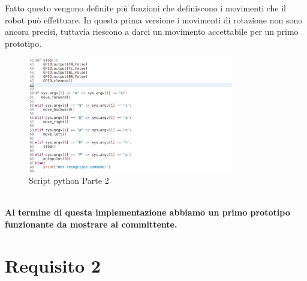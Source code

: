\documentclass{llncs}
\begin{document}
Fatto questo vengono definite pi\`u funzioni che definiscono i movimenti che il robot pu\`o effettuare. In questa prima versione i movimenti di rotazione non sono ancora precisi, tuttavia riescono a darci un movimento accettabile per un primo prototipo.
\\
\begin{figure}
   
    \includegraphics[width=0.8\textwidth]{Immagini/Scripts/Script(2)req1.png}
    \caption{Script python Parte 2}
    \label{fig:my_label}
\end{figure}
\vspace*{1ex}
\\
\textbf{Al termine di questa implementazione abbiamo un primo prototipo funzionante da mostrare al committente.}
\pagebreak

\section{Requisito 2}
\label{Requisito 2}
\end{document}
